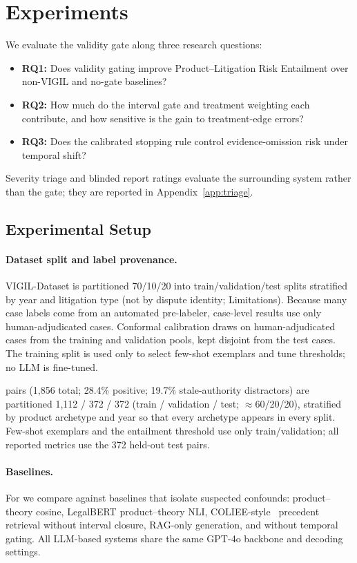 \section{Experiments}
\label{sec:experiments}

We evaluate the validity gate along three research questions:
\begin{itemize}[leftmargin=*]
\item \textbf{RQ1:} Does validity gating improve Product--Litigation Risk Entailment over non-VIGIL and no-gate baselines?
\item \textbf{RQ2:} How much do the interval gate and treatment weighting each contribute, and how sensitive is the gain to treatment-edge errors?
\item \textbf{RQ3:} Does the calibrated stopping rule control evidence-omission risk under temporal shift?
\end{itemize}
Severity triage and blinded report ratings evaluate the surrounding system rather than the gate; they are reported in Appendix~\ref{app:triage}.

\subsection{Experimental Setup}
\label{sec:setup}

\paragraph{Dataset split and label provenance.}
VIGIL-Dataset is partitioned 70/10/20 into train/validation/test splits stratified by year and litigation type (not by dispute identity; Limitations).
Because many case labels come from an automated pre-labeler, case-level results use only human-adjudicated cases.
Conformal calibration draws on human-adjudicated cases from the training and validation pools, kept disjoint from the test cases.
The training split is used only to select few-shot exemplars and tune thresholds; no LLM is fine-tuned.

\plre{} pairs (1{,}856 total; 28.4\% positive; 19.7\% stale-authority distractors) are partitioned 1{,}112 / 372 / 372 (train / validation / test; $\approx$60/20/20), stratified by product archetype and year so that every archetype appears in every split.
Few-shot exemplars and the entailment threshold use only train/validation; all reported metrics use the 372 held-out test pairs.

\paragraph{Baselines.}
For \plre{} we compare against baselines that isolate suspected confounds: product--theory cosine, LegalBERT product--theory NLI, COLIEE-style~\citep{rabelo2022coliee} precedent retrieval without interval closure, RAG-only generation, and \sysname{} without temporal gating.
All LLM-based systems share the same GPT-4o backbone and decoding settings.

